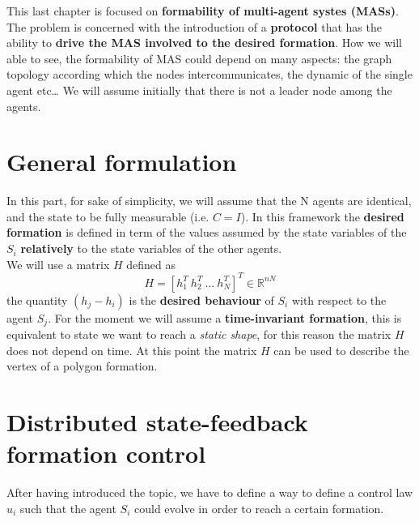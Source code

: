 This last chapter is focused on \textbf{formability of multi-agent systes  (MASs)}. The problem is concerned with the introduction of a \textbf{protocol} that has the ability to \textbf{drive the MAS involved to the desired formation}. How we will able to see, the formability of MAS could depend on many aspects: the graph topology according which the nodes intercommunicates, the dynamic of the single agent etc\dots
We will assume initially that there is not a leader node among the agents.

\section{General formulation}
\noindent
In this part, for sake of simplicity, we will assume that the N agents are identical, and the state to be fully measurable (i.e. $C=I$). In this framework the \textbf{desired formation} is defined in term of the values assumed by the state variables of the $S_i$ \textbf{relatively} to the state variables of the other agents.\\
We will use a matrix $H$ defined as
\begin{equation*}
    H = [h_1^T\ h_2^T \ ... \ h_N^T]^T \in \mathbb{R}^{nN}
\end{equation*}
the quantity $(h_j-h_i)$ is the \textbf{desired behaviour} of $S_i$ with respect to the agent $S_j$. For the moment we will assume a \textbf{time-invariant formation}, this is equivalent to state we want to reach a \textit{static shape}, for this reason the matrix $H$ does not depend on time. At this point the matrix  $H$ can be used to describe the vertex of a polygon formation.\\

\section{Distributed state-feedback formation control}
After having introduced the topic, we have to define a way to define a control law $u_i$ such that the agent $S_i$ could evolve in order to reach a certain formation.

